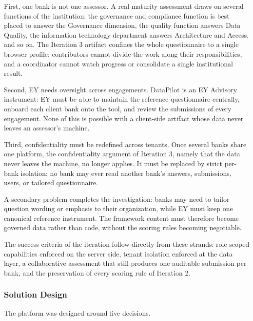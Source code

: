 First, one bank is not one assessor. A real maturity assessment draws on several functions of the institution: the governance and compliance function is best placed to answer the Governance dimension, the quality function answers Data Quality, the information technology department answers Architecture and Access, and so on. The Iteration 3 artifact confines the whole questionnaire to a single browser profile: contributors cannot divide the work along their responsibilities, and a coordinator cannot watch progress or consolidate a single institutional result.

Second, EY needs oversight across engagements. DataPilot is an EY Advisory instrument: EY must be able to maintain the reference questionnaire centrally, onboard each client bank onto the tool, and review the submissions of every engagement. None of this is possible with a client-side artifact whose data never leaves an assessor's machine.

Third, confidentiality must be redefined across tenants. Once several banks share one platform, the confidentiality argument of Iteration 3, namely that the data never leaves the machine, no longer applies. It must be replaced by strict per-bank isolation: no bank may ever read another bank's answers, submissions, users, or tailored questionnaire.

A secondary problem completes the investigation: banks may need to tailor question wording or emphasis to their organization, while EY must keep one canonical reference instrument. The framework content must therefore become governed data rather than code, without the scoring rules becoming negotiable.

The success criteria of the iteration follow directly from these strands: role-scoped capabilities enforced on the server side, tenant isolation enforced at the data layer, a collaborative assessment that still produces one auditable submission per bank, and the preservation of every scoring rule of Iteration 2.

\subsubsection{Solution Design}

The platform was designed around five decisions.

